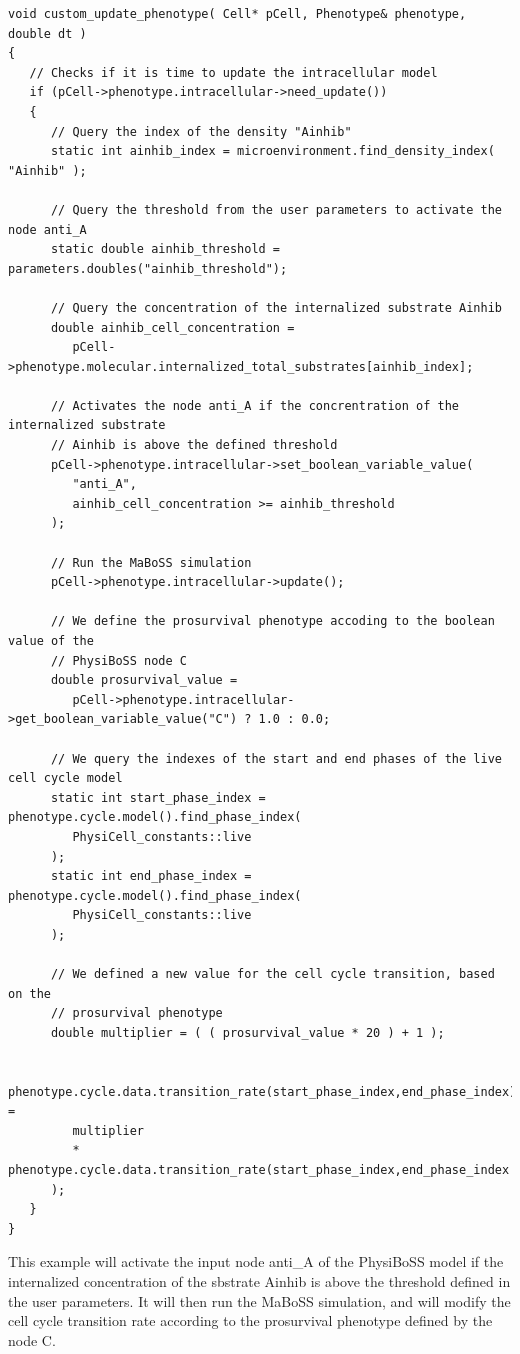 \documentclass[12pt]{article}
\begin{document}
\begin{verbatim}
void custom_update_phenotype( Cell* pCell, Phenotype& phenotype, double dt )
{
   // Checks if it is time to update the intracellular model
   if (pCell->phenotype.intracellular->need_update())
   {
      // Query the index of the density "Ainhib"
      static int ainhib_index = microenvironment.find_density_index( "Ainhib" );
      
      // Query the threshold from the user parameters to activate the node anti_A
      static double ainhib_threshold = parameters.doubles("ainhib_threshold");
	
      // Query the concentration of the internalized substrate Ainhib
      double ainhib_cell_concentration = 
         pCell->phenotype.molecular.internalized_total_substrates[ainhib_index];
      
      // Activates the node anti_A if the concrentration of the internalized substrate 
      // Ainhib is above the defined threshold
      pCell->phenotype.intracellular->set_boolean_variable_value(
         "anti_A", 
         ainhib_cell_concentration >= ainhib_threshold
      );
		
      // Run the MaBoSS simulation
      pCell->phenotype.intracellular->update();
	
      // We define the prosurvival phenotype accoding to the boolean value of the 
      // PhysiBoSS node C
      double prosurvival_value =
         pCell->phenotype.intracellular->get_boolean_variable_value("C") ? 1.0 : 0.0;
	
      // We query the indexes of the start and end phases of the live cell cycle model
      static int start_phase_index = phenotype.cycle.model().find_phase_index(
         PhysiCell_constants::live 
      ); 
      static int end_phase_index = phenotype.cycle.model().find_phase_index(
         PhysiCell_constants::live 
      );
      
      // We defined a new value for the cell cycle transition, based on the
      // prosurvival phenotype
      double multiplier = ( ( prosurvival_value * 20 ) + 1 ); 
      
      phenotype.cycle.data.transition_rate(start_phase_index,end_phase_index) =
         multiplier 
         * phenotype.cycle.data.transition_rate(start_phase_index,end_phase_index
      );
   }	
}

\end{verbatim}

This example will activate the input node anti\_A of the PhysiBoSS model if the internalized concentration of the sbstrate Ainhib is above the threshold defined in the user parameters. It will then run the MaBoSS simulation, and will modify the cell cycle transition rate according to the prosurvival phenotype defined by the node C. 
\end{document}
